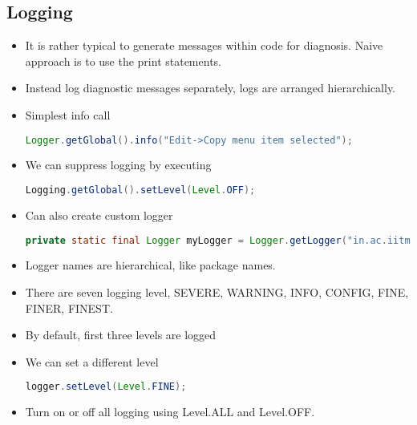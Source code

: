 \documentclass[a4paper]{article}
\begin{document}
\subsection{Logging}
\begin{itemize}
    \item It is rather typical to generate messages within code for diagnosis. Naive approach is to use the print statements.
    \item Instead log diagnostic messages separately, logs are arranged hierarchically.
    \item Simplest info call
    \begin{lstlisting}[language=Java]
        Logger.getGlobal().info("Edit->Copy menu item selected");
    \end{lstlisting}
    \item We can suppress logging by executing
    \begin{lstlisting}[language=Java]
        Logging.getGlobal().setLevel(Level.OFF);
    \end{lstlisting}
    \item Can also create custom logger
    \begin{lstlisting}[language=Java]
private static final Logger myLogger = Logger.getLogger("in.ac.iitm.onlinedegree");
    \end{lstlisting}
    \item Logger names are hierarchical, like package names.
    \item There are seven logging level, SEVERE, WARNING, INFO, CONFIG, FINE, FINER, FINEST.
    \item By default, first three levels are logged
    \item We can set a different level
    \begin{lstlisting}[language=Java]
        logger.setLevel(Level.FINE);
    \end{lstlisting}
    \item Turn on or off all logging using Level.ALL and Level.OFF.
\end{itemize}
\end{document}

